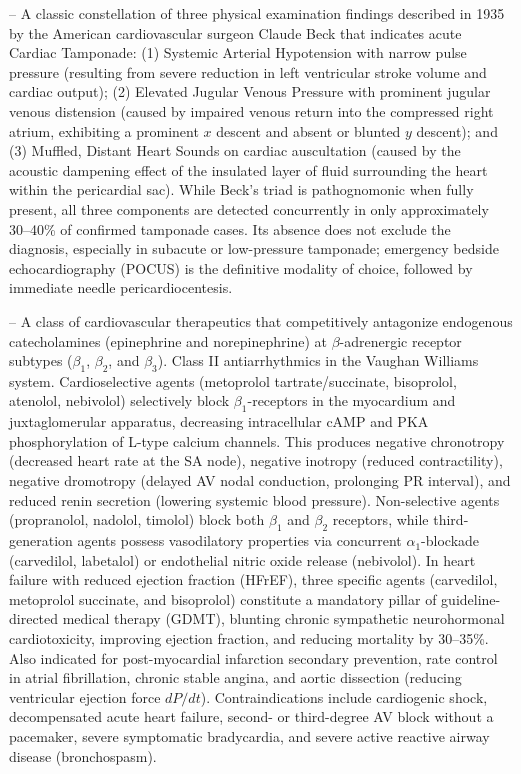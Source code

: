 -- A classic constellation of three physical examination findings described in 1935 by the American cardiovascular surgeon Claude Beck that indicates acute Cardiac Tamponade: (1) Systemic Arterial Hypotension with narrow pulse pressure (resulting from severe reduction in left ventricular stroke volume and cardiac output); (2) Elevated Jugular Venous Pressure with prominent jugular venous distension (caused by impaired venous return into the compressed right atrium, exhibiting a prominent $x$ descent and absent or blunted $y$ descent); and (3) Muffled, Distant Heart Sounds on cardiac auscultation (caused by the acoustic dampening effect of the insulated layer of fluid surrounding the heart within the pericardial sac). While Beck's triad is pathognomonic when fully present, all three components are detected concurrently in only approximately 30--40\% of confirmed tamponade cases. Its absence does not exclude the diagnosis, especially in subacute or low-pressure tamponade; emergency bedside echocardiography (POCUS) is the definitive modality of choice, followed by immediate needle pericardiocentesis.

-- A class of cardiovascular therapeutics that competitively antagonize endogenous catecholamines (epinephrine and norepinephrine) at $\beta$-adrenergic receptor subtypes ($\beta_1$, $\beta_2$, and $\beta_3$). Class II antiarrhythmics in the Vaughan Williams system. Cardioselective agents (metoprolol tartrate/succinate, bisoprolol, atenolol, nebivolol) selectively block $\beta_1$-receptors in the myocardium and juxtaglomerular apparatus, decreasing intracellular cAMP and PKA phosphorylation of L-type calcium channels. This produces negative chronotropy (decreased heart rate at the SA node), negative inotropy (reduced contractility), negative dromotropy (delayed AV nodal conduction, prolonging PR interval), and reduced renin secretion (lowering systemic blood pressure). Non-selective agents (propranolol, nadolol, timolol) block both $\beta_1$ and $\beta_2$ receptors, while third-generation agents possess vasodilatory properties via concurrent $\alpha_1$-blockade (carvedilol, labetalol) or endothelial nitric oxide release (nebivolol). In heart failure with reduced ejection fraction (HFrEF), three specific agents (carvedilol, metoprolol succinate, and bisoprolol) constitute a mandatory pillar of guideline-directed medical therapy (GDMT), blunting chronic sympathetic neurohormonal cardiotoxicity, improving ejection fraction, and reducing mortality by 30--35\%. Also indicated for post-myocardial infarction secondary prevention, rate control in atrial fibrillation, chronic stable angina, and aortic dissection (reducing ventricular ejection force $dP/dt$). Contraindications include cardiogenic shock, decompensated acute heart failure, second- or third-degree AV block without a pacemaker, severe symptomatic bradycardia, and severe active reactive airway disease (bronchospasm).

